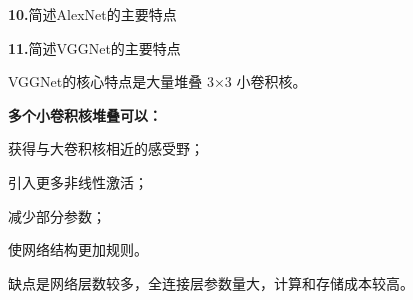 \documentclass[UTF8,openany,oneside,zihao=-4,fontset=windows]{ctexbook}
\newif\ifshowsolutions
\newcommand{\Question}[2]{%
  \par\Needspace{4\baselineskip}\medskip
  \noindent\textbf{\color{MVBlue}#1}\quad #2\par
}
\newenvironment{AnswerBox}{\begin{tcolorbox}[breakable,colback=MVLight,colframe=MVBlue!45,title={参考答案},fonttitle=\bfseries,boxrule=0.55pt,arc=1.5mm,left=2mm,right=2mm,top=1.5mm,bottom=1.5mm]}{\end{tcolorbox}}
\newcommand{\PracticeSpace}[1]{\ifshowsolutions\else\par\vspace{#1}\par\fi}
\begin{document}
\ifshowsolutions
\begin{AnswerBox}
\par 过拟合是指模型在训练集上表现很好，但在验证集或测试集上表现较差，说明模型记住了训练数据中的细节和噪声，泛化能力不足。
\par\noindent\textbf{常用缓解方法：}
\par\noindent\textbullet\quad 增加训练数据；
\par\noindent\textbullet\quad 数据增强；
\par\noindent\textbullet\quad Dropout；
\par\noindent\textbullet\quad 权重衰减；
\par\noindent\textbullet\quad 早停；
\par\noindent\textbullet\quad 降低模型复杂度；
\par\noindent\textbullet\quad Batch Normalization；
\par 使用预训练模型。
\end{AnswerBox}
\else
\PracticeSpace{2.4cm}
\fi
\Question{10.}{简述AlexNet的主要特点}
\ifshowsolutions
\begin{AnswerBox}
\par\noindent\textbf{AlexNet的主要特点包括：}
\par\noindent\textbullet\quad 使用ReLU替代传统Sigmoid或Tanh；
\par\noindent\textbullet\quad 使用Dropout缓解全连接层过拟合；
\par\noindent\textbullet\quad 使用数据增强；
\par\noindent\textbullet\quad 使用最大池化；
\par 采用较深的卷积神经网络完成大规模图像分类。
\par AlexNet证明了深度卷积网络在大规模视觉任务上的有效性。
\end{AnswerBox}
\else
\PracticeSpace{2.4cm}
\fi
\Question{11.}{简述VGGNet的主要特点}
\ifshowsolutions
\begin{AnswerBox}
\par VGGNet的核心特点是大量堆叠 3×3 小卷积核。
\par\noindent\textbf{多个小卷积核堆叠可以：}
\par\noindent\textbullet\quad 获得与大卷积核相近的感受野；
\par\noindent\textbullet\quad 引入更多非线性激活；
\par\noindent\textbullet\quad 减少部分参数；
\par 使网络结构更加规则。
\par 缺点是网络层数较多，全连接层参数量大，计算和存储成本较高。
\end{AnswerBox}
\end{document}
